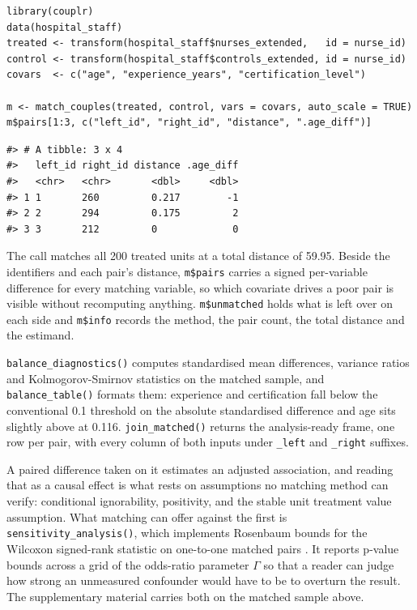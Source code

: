 \begin{verbatim}
library(couplr)
data(hospital_staff)
treated <- transform(hospital_staff$nurses_extended,   id = nurse_id)
control <- transform(hospital_staff$controls_extended, id = nurse_id)
covars  <- c("age", "experience_years", "certification_level")

m <- match_couples(treated, control, vars = covars, auto_scale = TRUE)
m$pairs[1:3, c("left_id", "right_id", "distance", ".age_diff")]
\end{verbatim}

\begin{verbatim}
#> # A tibble: 3 x 4
#>   left_id right_id distance .age_diff
#>   <chr>   <chr>       <dbl>     <dbl>
#> 1 1       260         0.217        -1
#> 2 2       294         0.175         2
#> 3 3       212         0             0
\end{verbatim}

The call matches all 200 treated units at a total distance of
59.95. Beside the identifiers and each
pair's distance, \texttt{m\$pairs} carries a signed per-variable difference for every
matching variable, so which covariate drives a poor pair is visible without recomputing anything. \texttt{m\$unmatched} holds what is left over on each side and
\texttt{m\$info} records the method, the pair count, the total distance and the
estimand.

\texttt{balance\_diagnostics()} computes standardised mean differences, variance
ratios and Kolmogorov-Smirnov statistics on the matched sample, and
\texttt{balance\_table()} formats them: experience and certification fall below the
conventional 0.1 threshold on the absolute standardised difference
\citep{Stuart2010} and age sits slightly above at 0.116. \texttt{join\_matched()} returns
the analysis-ready frame, one row per pair, with every column of both inputs
under \texttt{\_left} and \texttt{\_right} suffixes.

A paired difference taken on it estimates an adjusted association, and
reading that as a causal effect is what rests on assumptions no matching method
can verify: conditional ignorability, positivity, and the stable unit treatment
value assumption. What matching can offer against the first is
\texttt{sensitivity\_analysis()}, which implements Rosenbaum bounds for the Wilcoxon
signed-rank statistic on one-to-one matched pairs \citep{Rosenbaum2002}. It reports p-value bounds across a grid of the odds-ratio parameter \(\Gamma\) so that a
reader can judge how strong an unmeasured confounder would have to be to
overturn the result. The supplementary material carries both on the matched
sample above.

